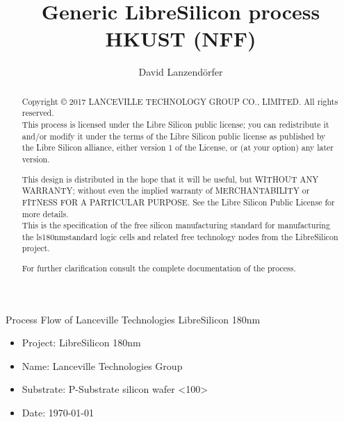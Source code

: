 \documentclass[10pt,a4paper,twoside]{article}
\author{David Lanzendörfer}
\title{Generic LibreSilicon process HKUST (NFF)}
\begin{document}
\maketitle

\begin{abstract}
	Copyright © 2017 LANCEVILLE TECHNOLOGY GROUP CO., LIMITED. All rights reserved. \\

	This process is licensed under the Libre Silicon public license; you can redistribute it and/or modify it under the terms of the Libre Silicon public license
	as published by the Libre Silicon alliance, either version 1 of the License, or (at your option) any later version.

	This design is distributed in the hope that it will be useful, but WITHOUT ANY WARRANTY; without even the implied warranty of MERCHANTABILITY or FITNESS FOR A PARTICULAR PURPOSE.
	See the Libre Silicon Public License for more details. \\

	This is the specification of the free silicon manufacturing standard for manufacturing the ls180nm\footnotemark standard logic cells and related free technology nodes from the LibreSilicon project.
	
	For further clarification consult the complete documentation of the process.

\end{abstract}
\vfill
\newpage

Process Flow of Lanceville Technologies LibreSilicon 180nm

\begin{itemize}
	\item Project: LibreSilicon 180nm
	\item Name: Lanceville Technologies Group
	\item Substrate: P-Substrate silicon wafer <100>
	\item Date: \today
\end{itemize}
\end{document}
